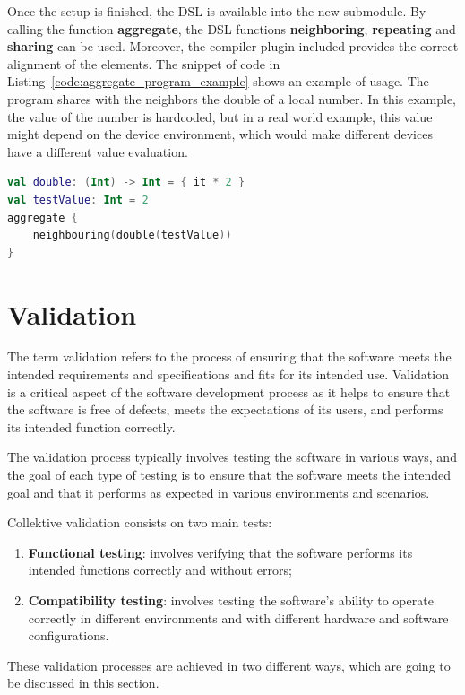 Once the setup is finished, the DSL is available into the new submodule. By calling the function \textbf{aggregate}, the DSL functions \textbf{neighboring}, \textbf{repeating} and \textbf{sharing} can be used. Moreover, the compiler plugin included provides the correct alignment of the elements.\newline
The snippet of code in Listing~\ref{code:aggregate_program_example} shows an example of usage. The program shares with the neighbors the double of a local number. In this example, the value of the number is hardcoded, but in a real world example, this value might depend on the device environment, which would make different devices have a different value evaluation.
\begin{lstlisting}[caption={Example of an aggregate program developed with Collektive}, captionpos=b, language=Kotlin, label={code:aggregate_program_example}]
val double: (Int) -> Int = { it * 2 }
val testValue: Int = 2
aggregate {
    neighbouring(double(testValue))
}
\end{lstlisting}

\section{Validation}\label{section:validation}
The term validation refers to the process of ensuring that the software meets the intended requirements and specifications and fits for its intended use. Validation is a critical aspect of the software development process as it helps to ensure that the software is free of defects, meets the expectations of its users, and performs its intended function correctly.

The validation process typically involves testing the software in various ways, and the goal of each type of testing is to ensure that the software meets the intended goal and that it performs as expected in various environments and scenarios.

Collektive validation consists on two main tests:
\begin{enumerate}
    \item \textbf{Functional testing}: involves verifying that the software performs its intended functions correctly and without errors;
    \item \textbf{Compatibility testing}: involves testing the software's ability to operate correctly in different environments and with different hardware and software configurations.
\end{enumerate}
These validation processes are achieved in two different ways, which are going to be discussed in this section.

